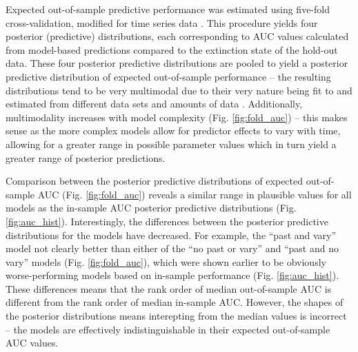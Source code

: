 \documentclass[12pt,letterpaper]{article}
\begin{document}
Expected out-of-sample predictive performance was estimated using five-fold cross-validation, modified for time series data \citep{ESL}. This procedure yields four posterior (predictive) distributions, each corresponding to AUC values calculated from model-based predictions compared to the extinction state of the hold-out data. These four posterior predictive distributions are pooled to yield a posterior predictive distribution of expected out-of-sample performance -- the resulting distributions tend to be very multimodal due to their very nature being fit to and estimated from different data sets and amounts of data \citep{ESL}. Additionally, multimodality increases with model complexity (Fig. \ref{fig:fold_auc}) -- this makes sense as the more complex models allow for predictor effects to vary with time, allowing for a greater range in possible parameter values which in turn yield a greater range of posterior predictions.

Comparison between the posterior predictive distributions of expected out-of-sample AUC (Fig. \ref{fig:fold_auc}) reveals a similar range in plausible values for all models as the in-sample AUC posterior predictive distributions (Fig. \ref{fig:auc_hist}). Interestingly, the differences between the posterior predictive distributions for the models have decreased. For example, the ``past and vary'' model not clearly better than either of the ``no past or vary'' and ``past and no vary'' models (Fig. \ref{fig:fold_auc}), which were shown earlier to be obviously worse-performing models based on in-sample performance (Fig. \ref{fig:auc_hist}). These differences means that the rank order of median out-of-sample AUC is different from the rank order of median in-sample AUC. However, the shapes of the posterior distributions means interepting from the median values is incorrect -- the models are effectively indistinguishable in their expected out-of-sample AUC values.
\end{document}
